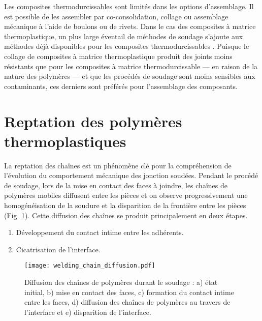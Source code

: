 Les composites thermodurcissables sont limités dans les options d'assemblage. 
Il est possible de les assembler par co-consolidation, collage ou assemblage mécanique à l'aide de boulons ou de rivets.
Dans le cas des composites à matrice thermoplastique, un plus large éventail de méthodes de soudage s'ajoute aux méthodes déjà disponibles pour les composites thermodurcissables \cite{campbell2003}. 
Puisque le collage de composites à matrice thermoplastique produit des joints moins résistants que pour les composites à matrice thermodurcissable --- en raison de la nature des polymères \cite{campbell2003} --- et que les procédés de soudage sont moins sensibles aux contaminants, ces derniers sont préférés pour l'assemblage des composants. 

\section{Reptation des polymères thermoplastiques}

La reptation des chaînes est un phénomène clé pour la compréhension de l'évolution du comportement mécanique des jonction soudées. 
Pendant le procédé de soudage, lors de la mise en contact des faces à joindre, les chaînes de polymères mobiles diffusent entre les pièces et on observe progressivement une homogénéisation de la soudure et la disparition de la frontière entre les pièces (Fig. \ref{fig:polymer_diffusion}). 
Cette diffusion des chaînes se produit principalement en deux étapes. 
\begin{enumerate}
	\item Développement du contact intime entre les adhérents.
	\item Cicatrisation de l'interface.
\end{enumerate}

\begin{figure}[h]
	\centering
	\texttt{[image: welding\_chain\_diffusion.pdf]}
	\caption{Diffusion des chaînes de polymères durant le soudage : a) état initial, b) mise en contact des faces, c) formation du contact intime entre les faces, d) diffusion des chaînes de polymères au travers de l'interface et e) disparition de l'interface. }
	\label{fig:polymer_diffusion}
\end{figure}

